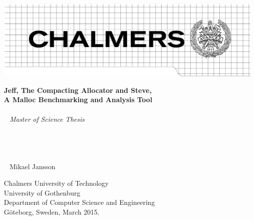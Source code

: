 \begin{titlepage}
\thispagestyle{empty}
\vspace*{-1.88in}
\hspace*{-1.63in}
\includegraphics[width=600pt]{graphics/chalmers/Chalmers} %

\vspace{3in}

\noindent
{\Large \bf Jeff, The Compacting Allocator and Steve, \\
A Malloc Benchmarking and Analysis Tool} \\
\\ ~
{\Large \it Master of Science Thesis} \\
\\ ~
\\ ~
\\ ~
\\ ~
{\Large Mikael Jansson}

\vfill
\noindent
Chalmers University of Technology \\
University of Gothenburg \\
Department of Computer Science and Engineering \\
Göteborg, Sweden, March 2015.

\end{titlepage}

\newpage{}
\thispagestyle{empty}
\mbox{}

